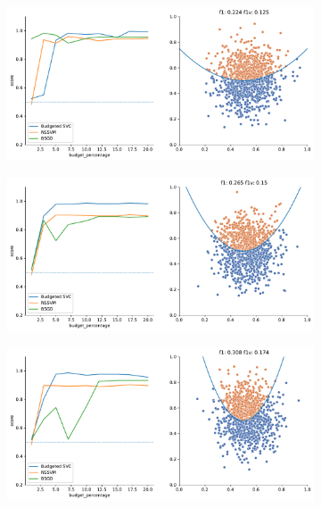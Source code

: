 \begin{appendices}
\begin{figure}
    \begin{subfigure}{.5\textwidth}
        \centering
        \includegraphics[width=\textwidth]{img/comp_new/1.pdf}
    \end{subfigure}%
    \begin{subfigure}{.5\textwidth}
        \centering
        \includegraphics[width=\textwidth]{img/comp_new/2.pdf}
    \end{subfigure}
    \hfill
    \begin{subfigure}{.5\textwidth}
        \centering
        \includegraphics[width=\textwidth]{img/comp_new/3.pdf}

\end{subfigure}
\end{figure}
\end{appendices}
